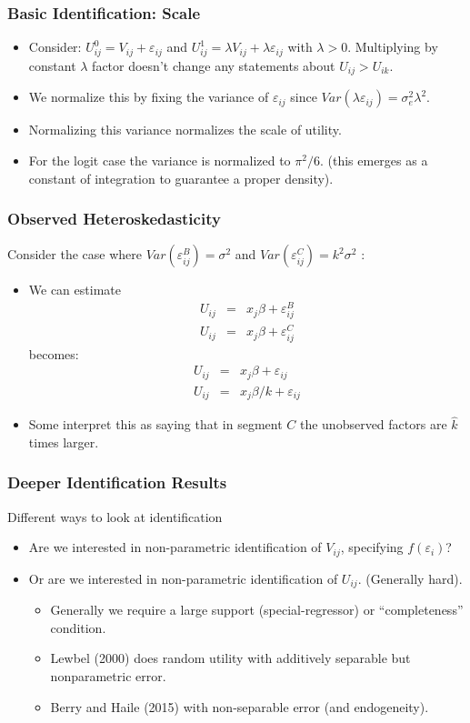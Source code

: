 \documentclass[xcolor=pdftex,dvipsnames,table,mathserif,aspectratio=169]{beamer}
\begin{document}
\begin{frame}
\frametitle{Basic Identification: Scale}
\begin{itemize}
\item Consider: $U_{ij}^0 = V_{ij} + \varepsilon_{ij}$ and  $U_{ij}^1 = \lambda V_{ij} + \lambda \varepsilon_{ij}$ with $\lambda > 0$. Multiplying by constant $\lambda$ factor doesn't change any statements about $U_{ij} > U_{ik}$.
\item We normalize this by fixing the variance of $\varepsilon_{ij}$ since $Var(\lambda \varepsilon_{ij} ) = \sigma_e^2 \lambda^2$.
\item Normalizing this variance normalizes the scale of utility.
\item For the logit case the variance is normalized to $\pi^2/6$. (this emerges as a constant of integration to guarantee a proper density).
\end{itemize}
\end{frame}



\begin{frame}
\frametitle{Observed Heteroskedasticity}
Consider the case where $Var(\varepsilon_{ij}^B) = \sigma^2$ and   $Var(\varepsilon_{ij}^C) =  k^2 \sigma^2$ :
\begin{itemize}
\item We can estimate
\begin{eqnarray*}
U_{ij} &=& x_j \beta + \varepsilon_{ij}^B\\
U_{ij} &=& x_j \beta + \varepsilon_{ij}^C
\end{eqnarray*}
becomes:
\begin{eqnarray*}
U_{ij} &=& x_j \beta + \varepsilon_{ij}\\
U_{ij} &=& x_j \beta/k+ \varepsilon_{ij}
\end{eqnarray*}
\item Some interpret this as saying that in segment $C$ the unobserved factors are $\hat{k}$ times larger.
\end{itemize}
\end{frame}

\begin{frame}
\frametitle{Deeper Identification Results}
Different ways to look at identification
\begin{itemize}
\item Are we interested in non-parametric identification of $V_{ij}$, specifying $f(\varepsilon_i)$?
\item Or are we interested in non-parametric identification of $U_{ij}$. (Generally hard).
\begin{itemize}
\item Generally we require a large support (special-regressor) or ``completeness'' condition.
\item Lewbel (2000) does random utility with additively separable but nonparametric error.\item Berry and Haile (2015) with non-separable error (and endogeneity).
\end{itemize}
\end{itemize}
\end{frame}
\end{document}
